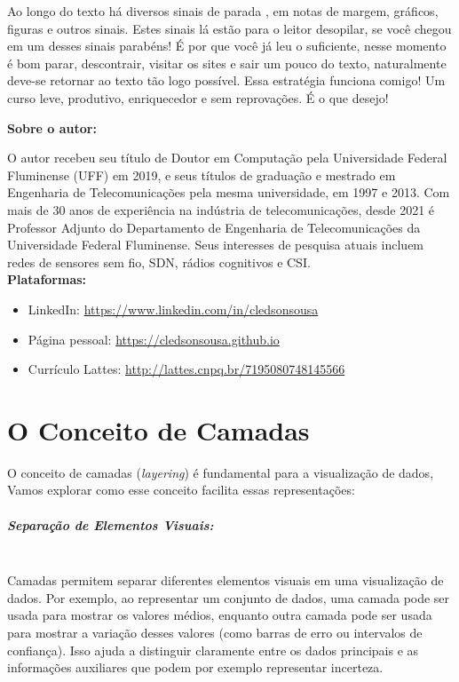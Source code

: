 \documentclass[article]{memoir}
\let\section\chapter    %
\begin{document}
Ao longo do texto há diversos sinais de parada , em notas de margem, gráficos, figuras e outros sinais. Estes sinais lá estão  para o leitor desopilar, se você chegou em um desses sinais parabéns! É por que você já leu o suficiente, nesse momento é bom parar, descontrair, visitar os sites e sair um pouco do texto, naturalmente deve-se retornar ao texto tão logo possível. Essa estratégia funciona comigo!
Um curso leve, produtivo, enriquecedor e sem reprovações. É o que desejo!

\textbf{Sobre o autor:}

O autor recebeu seu título de Doutor em Computação pela Universidade Federal Fluminense (UFF) em 2019, e seus títulos de graduação e mestrado em Engenharia de Telecomunicações pela mesma universidade, em 1997 e 2013. Com mais de 30 anos de experiência na indústria de telecomunicações, desde 2021 é Professor Adjunto do Departamento de Engenharia de Telecomunicações da Universidade Federal Fluminense. Seus interesses de pesquisa atuais incluem redes de sensores sem fio, SDN, rádios cognitivos e CSI.\mbox{}\\

\textbf{Plataformas:}

\begin{itemize}
	\item LinkedIn: \url{https://www.linkedin.com/in/cledsonsousa}
	\item Página pessoal: \url{https://cledsonsousa.github.io}
	\item Currículo Lattes: \url{http://lattes.cnpq.br/7195080748145566}
\end{itemize}

\newpage

\section{O Conceito de Camadas}
O conceito de camadas (\textit{layering}) é fundamental para a visualização de dados, Vamos explorar como esse conceito facilita essas representações:

\paragraph*{Separação de Elementos Visuais:}\mbox{}\\
Camadas permitem separar diferentes elementos visuais em uma visualização de dados. Por exemplo, ao representar um conjunto de dados, uma camada pode ser usada para mostrar os valores médios, enquanto outra camada pode ser usada para mostrar a variação desses valores (como barras de erro ou intervalos de confiança). Isso ajuda a distinguir claramente entre os dados principais e as informações auxiliares que podem por exemplo  representar incerteza.
\end{document}
